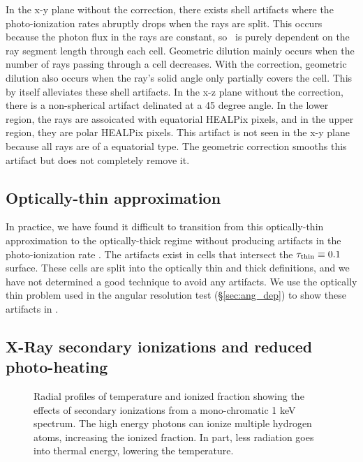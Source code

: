 \documentclass[12pt,preprint]{aastex}
\begin{document}
In the x-y plane without the correction, there exists shell artifacts
where the photo-ionization rates abruptly drops when the rays are
split.  This occurs because the photon flux in the rays are constant,
so \kph~is purely dependent on the ray segment length through each
cell.  Geometric dilution mainly occurs when the number of rays
passing through a cell decreases.  With the correction, geometric
dilution also occurs when the ray's solid angle only partially covers
the cell.  This by itself alleviates these shell artifacts.  In the
x-z plane without the correction, there is a non-spherical artifact
delinated at a 45 degree angle.  In the lower region, the rays are
assoicated with equatorial HEALPix pixels, and in the upper region,
they are polar HEALPix pixels.  This artifact is not seen in the x-y
plane because all rays are of a equatorial type.  The geometric
correction smooths this artifact but does not completely remove it.

\subsection{Optically-thin approximation}

In practice, we have found it difficult to transition from this
optically-thin approximation to the optically-thick regime without
producing artifacts in the photo-ionization rate \kph.  The artifacts
exist in cells that intersect the $\tau_{\rm thin} \equiv 0.1$
surface.  These cells are split into the optically thin and thick
definitions, and we have not determined a good technique to avoid any
artifacts.  We use the optically thin problem used in the angular
resolution test (\S\ref{sec:ang_dep}) to show these artifacts in \kph.

\subsection{X-Ray secondary ionizations and reduced photo-heating}

\begin{figure}[t]
  \caption{\label{fig:xray_fig} Radial profiles of temperature and
    ionized fraction showing the effects of secondary ionizations from
    a mono-chromatic 1 keV spectrum.  The high energy photons can
    ionize multiple hydrogen atoms, increasing the ionized fraction.
    In part, less radiation goes into thermal energy, lowering the
    temperature.}
\end{figure}
\end{document}
